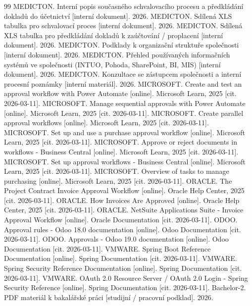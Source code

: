 \begin{thebibliography}{99}
 MEDICTON. Interní popis současného schvalovacího procesu a předkládání dokladů do účetnictví [interní dokument]. 2026.
 MEDICTON. Sdílená XLS tabulka pro schvalovací proces [interní dokument]. 2026.
 MEDICTON. Sdílená XLS tabulka pro předkládání dokladů k zaúčtování / proplacení [interní dokument]. 2026.
 MEDICTON. Podklady k organizační struktuře společnosti [interní dokument]. 2026.
 MEDICTON. Přehled používaných informačních systémů ve společnosti (INTUO, Pohoda, SharePoint, BI, MIS) [interní dokument]. 2026.
 MEDICTON. Konzultace se zástupcem společnosti a interní procesní poznámky [interní materiál]. 2026.
 MICROSOFT. Create and test an approval workflow with Power Automate [online]. Microsoft Learn, 2025 [cit. 2026-03-11].
 MICROSOFT. Manage sequential approvals with Power Automate [online]. Microsoft Learn, 2025 [cit. 2026-03-11].
 MICROSOFT. Create parallel approval workflows [online]. Microsoft Learn, 2025 [cit. 2026-03-11].
 MICROSOFT. Set up and use a purchase approval workflow [online]. Microsoft Learn, 2025 [cit. 2026-03-11].
 MICROSOFT. Approve or reject documents in workflows - Business Central [online]. Microsoft Learn, 2025 [cit. 2026-03-11].
 MICROSOFT. Set up approval workflows - Business Central [online]. Microsoft Learn, 2025 [cit. 2026-03-11].
 MICROSOFT. Overview of tasks to manage purchasing [online]. Microsoft Learn, 2025 [cit. 2026-03-11].
 ORACLE. The Project Contract Invoice Approval Workflow [online]. Oracle Help Center, 2025 [cit. 2026-03-11].
 ORACLE. How Invoices Are Approved [online]. Oracle Help Center, 2025 [cit. 2026-03-11].
 ORACLE. NetSuite Applications Suite - Invoice Approval Workflow [online]. Oracle Documentation [cit. 2026-03-11].
 ODOO. Approval rules - Odoo 18.0 documentation [online]. Odoo Documentation [cit. 2026-03-11].
 ODOO. Approvals - Odoo 19.0 documentation [online]. Odoo Documentation [cit. 2026-03-11].
 VMWARE. Spring Boot Reference Documentation [online]. Spring Documentation [cit. 2026-03-11].
 VMWARE. Spring Security Reference Documentation [online]. Spring Documentation [cit. 2026-03-11].
 VMWARE. OAuth 2.0 Resource Server / OAuth 2.0 Login - Spring Security Reference [online]. Spring Documentation [cit. 2026-03-11].
 Bachelor-2. PDF materiál k bakalářské práci [studijní / pracovní podklad]. 2026.
\end{thebibliography}